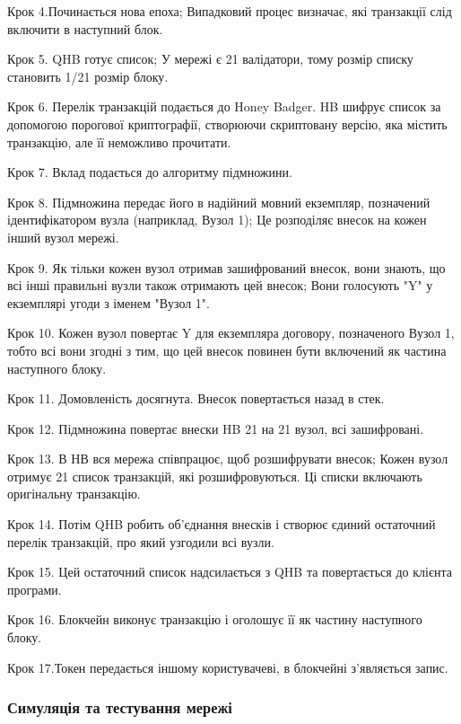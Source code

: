 \documentclass{lib/styles/default-style}
\begin{document}
    Крок 4.Починається нова епоха; Випадковий процес визначає, які транзакції слід включити в наступний блок.
    
    Крок 5. QHB готує список; У мережі є 21 валідатори, тому розмір списку становить 1/21 розмір блоку.
    
    Крок 6. Перелік транзакцій подається до Honey Badger. HB шифрує список за допомогою порогової криптографії,
        створюючи скриптовану версію, яка містить транзакцію, але її неможливо прочитати.
    
    Крок 7. Вклад подається до алгоритму підмножини.
    
    Крок 8. Підмножина передає його в надійний мовний екземпляр, позначений ідентифікатором вузла (наприклад, Вузол 1);
        Це розподіляє внесок на кожен інший вузол мережі.
    
    Крок 9. Як тільки кожен вузол отримав зашифрований внесок, вони знають, що всі інші правильні вузли
        також отримають цей внесок; Вони голосують "Y" у екземплярі угоди з іменем "Вузол 1".
    
    Крок 10. Кожен вузол повертає Y для екземпляра договору, позначеного Вузол 1, тобто всі вони згодні з тим,
        що цей внесок повинен бути включений як частина наступного блоку.
    
    Крок 11. Домовленість досягнута. Внесок повертається назад в стек.
    
    Крок 12. Підмножина повертає внески HB 21 на 21 вузол, всі зашифровані.
    
    Крок 13. В НВ вся мережа співпрацює, щоб розшифрувати внесок;
    Кожен вузол отримує 21 список транзакцій, які розшифровуються. Ці списки включають оригінальну транзакцію.
    
    Крок 14. Потім QHB робить об'єднання внесків і створює єдиний остаточний перелік транзакцій, про який узгодили всі вузли.
    
    Крок 15. Цей остаточний список надсилається з QHB та повертається до клієнта програми.
    
    Крок 16.  Блокчейн виконує транзакцію і оголошує її як частину наступного блоку.
    
    Крок 17.Токен передається іншому користувачеві, в блокчейні з'являється запис.
    
    \subsubsection{Симуляція та тестування мережі}
\end{document}
